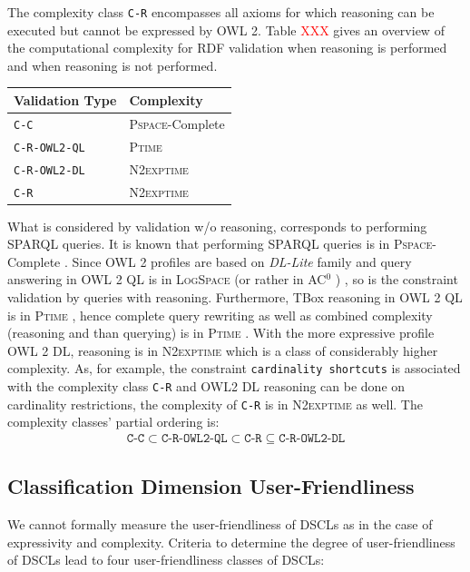 \documentclass{llncs}
\newcommand{\ms}[1]{\texttt{#1}}
\newenvironment{complexity}{
  \scriptsize
  \sffamily
  \vspace{0.3cm}
  \begin{tabular}{l|l}
  \hline
  \textbf{Validation Type} & \textbf{Complexity} \\
  \hline

}{
  \hline
  \end{tabular}
  \linebreak
}
\begin{document}
The complexity class \ms{C-R} encompasses all axioms for which reasoning can be executed but cannot be expressed by OWL 2.  
Table \textcolor{red}{XXX} gives an overview of the computational complexity for RDF validation when reasoning is performed and when reasoning is not performed. 

\begin{complexity}
\ms{C-C} & \textsc{Pspace}-Complete \\
\ms{C-R-OWL2-QL} & \textsc{Ptime} \\
\ms{C-R-OWL2-DL} & \textsc{N2exptime} \\
\ms{C-R} & \textsc{N2exptime} \\
\end{complexity}

What is considered by validation w/o reasoning, corresponds to performing SPARQL queries.  It is known that performing SPARQL queries is in \textsc{Pspace}-Complete \cite{Perez2009}. Since OWL 2 profiles are based on \textit{DL-Lite} family and query answering in OWL 2 QL is in \textsc{LogSpace} (or rather in AC$^0$ ) \cite{Calvanese2007}, so is the constraint validation by queries with  reasoning. Furthermore, TBox reasoning in OWL 2 QL is in \textsc{Ptime} \cite{Calvanese2007}, hence complete query rewriting as well as combined complexity (reasoning and than querying) is in \textsc{Ptime} \cite{Artale2009,Calvanese2007}.  With the more expressive profile OWL 2 DL, reasoning is in \textsc{N2exptime} \cite{owl2profiles2008} which is a class of considerably higher complexity.
As, for example, the constraint \ms{cardinality shortcuts} is associated with the complexity class \ms{C-R} and OWL2 DL reasoning can be done on cardinality restrictions,
the complexity of \ms{C-R} is in \textsc{N2exptime} as well. 
The complexity classes' partial ordering is:
\begin{eqnarray*}
\ms{C-C} \subset \ms{C-R-OWL2-QL} \subset \ms{C-R} \subseteq \ms{C-R-OWL2-DL}
\end{eqnarray*}

\subsection{Classification Dimension User-Friendliness}

We cannot formally measure the user-friendliness of DSCLs as in the case of expressivity and complexity. 
Criteria to determine the degree of user-friendliness of DSCLs lead to four user-friendliness classes of DSCLs:
\end{document}
